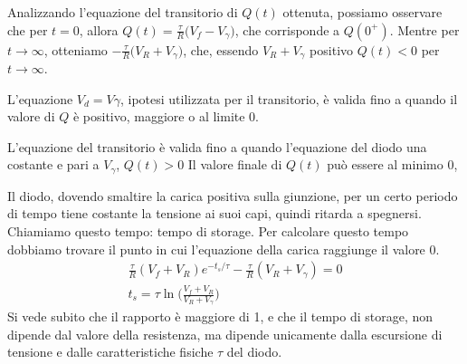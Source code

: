 \documentclass[../elettronica]{subfiles}
\begin{document}
Analizzando l'equazione del transitorio di $Q(t)$ ottenuta, possiamo osservare che per $t = 0$,
allora $Q(t) = \frac{\tau}{R}\big(V_f - V_\gamma\big)$, che corrisponde a $Q(0^+)$.
Mentre per $t \to \infty$, otteniamo $-\frac{\tau}{R}\big(V_R + V_\gamma)$, che, essendo $V_R + V_\gamma$ positivo
$Q(t) < 0$ per $t \to \infty$.

L'equazione $V_d = V\gamma$, ipotesi utilizzata per il transitorio, è valida fino a quando il valore
di $Q$ è positivo, maggiore o al limite 0.


L'equazione del transitorio è valida fino a quando l'equazione del diodo una costante e pari a $V_\gamma$, $Q(t) > 0$
Il valore finale di $Q(t)$ può essere al minimo 0,

Il diodo, dovendo smaltire la carica positiva sulla giunzione, per un certo periodo di tempo tiene costante
la tensione ai suoi capi, quindi ritarda a spegnersi. Chiamiamo questo tempo: tempo di storage.
Per calcolare questo tempo dobbiamo trovare il punto in cui l'equazione della carica raggiunge il valore 0.
\begin{align*}
    \frac{\tau}{R}(V_f + V_R) e ^ {-t_s/\tau} - \frac{\tau}{R}(V_R + V_\gamma) = 0
    \\
    t_s = \tau \ln\Big(\frac{V_f + V_R}{V_R + V_\gamma}\Big)
\end{align*}
Si vede subito che il rapporto è maggiore di 1, e che il tempo di storage, non dipende dal valore della resistenza,
ma dipende unicamente dalla escursione di tensione e dalle caratteristiche fisiche $\tau$ del diodo.
\end{document}
